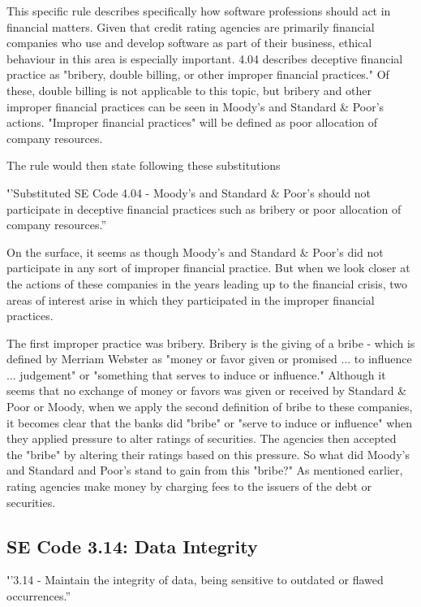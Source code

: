 \documentclass[11pt]{article}
\begin{document}
\begin{multicols}{2}
This specific rule describes specifically how software professions should act in financial matters.  Given that credit rating agencies are primarily financial companies who use and develop software as part of their business, ethical behaviour in this area is especially important.  
4.04 describes deceptive financial practice as "bribery, double billing, or other improper financial practices."  Of these, double billing is not applicable to this topic, but bribery and other improper financial practices can be seen in Moody's and Standard \& Poor's actions.  "Improper financial practices" will be defined as poor allocation of company resources.

The rule would then state following these substitutions

{\textbf''Substituted SE Code 4.04 - Moody's and Standard \& Poor's should not participate in deceptive financial practices such as bribery or poor allocation of company resources.''}


On the surface, it seems as though Moody's and Standard \& Poor's did not participate in any sort of improper financial practice.  But when we look closer at the actions of these companies in the years leading up to the financial crisis, two areas of interest arise in which they participated in the improper financial practices.  

The first improper practice was bribery.  Bribery is the giving of a bribe - which is defined by Merriam Webster as "money or favor given or promised ... to influence ... judgement" or "something that serves to induce or influence." \cite{bribeDef}  Although it seems that no exchange of money or favors was given or received by Standard \& Poor or Moody, when we apply the second definition of bribe to these companies, it becomes clear that the banks did "bribe" or "serve to induce or influence" when they applied pressure to alter ratings of securities.  The agencies then accepted the "bribe" by altering their ratings based on this pressure.  
So what did Moody's and Standard and Poor's stand to gain from this "bribe?"  As mentioned earlier, rating agencies make money by charging fees to the issuers of the debt or securities.  


\subsection{SE Code 3.14: Data Integrity}

{\textbf''3.14 - Maintain the integrity of data, being sensitive to outdated or flawed occurrences.''}


\end{multicols}
\end{document}
